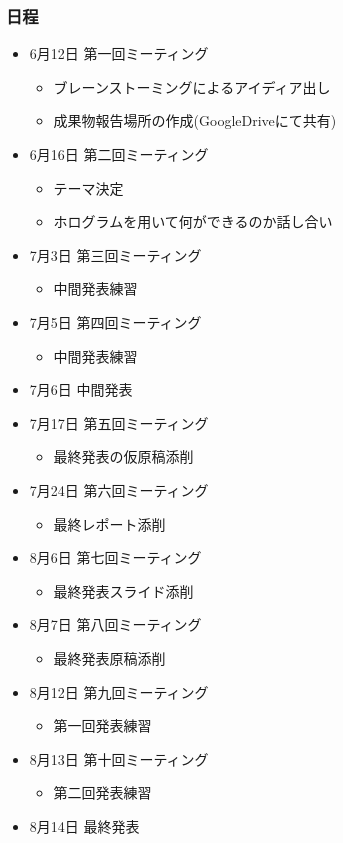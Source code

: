 \documentclass[11pt,a4paper]{jsarticle}
\begin{document}
\subsubsection{日程}
\begin{itemize}
\item 6月12日 第一回ミーティング
\begin{itemize}
\item ブレーンストーミングによるアイディア出し
\item 成果物報告場所の作成(GoogleDriveにて共有)
\end{itemize}
\item 6月16日 第二回ミーティング
\begin{itemize}
\item テーマ決定
\item ホログラムを用いて何ができるのか話し合い
\end{itemize}
\item 7月3日 第三回ミーティング
\begin{itemize}
\item 中間発表練習
\end{itemize}
\item 7月5日 第四回ミーティング
\begin{itemize}
\item 中間発表練習
\end{itemize}
\item 7月6日 中間発表
\item 7月17日 第五回ミーティング
\begin{itemize}
\item 最終発表の仮原稿添削
\end{itemize}
\item 7月24日 第六回ミーティング
\begin{itemize}
\item 最終レポート添削
\end{itemize}
\item 8月6日 第七回ミーティング
\begin{itemize}
\item 最終発表スライド添削
\end{itemize}
\item 8月7日 第八回ミーティング
\begin{itemize}
\item 最終発表原稿添削
\end{itemize}
\item 8月12日 第九回ミーティング
\begin{itemize}
\item 第一回発表練習
\end{itemize}
\item 8月13日 第十回ミーティング
\begin{itemize}
\item 第二回発表練習
\end{itemize}
\item 8月14日 最終発表
\end{itemize}
\end{document}
